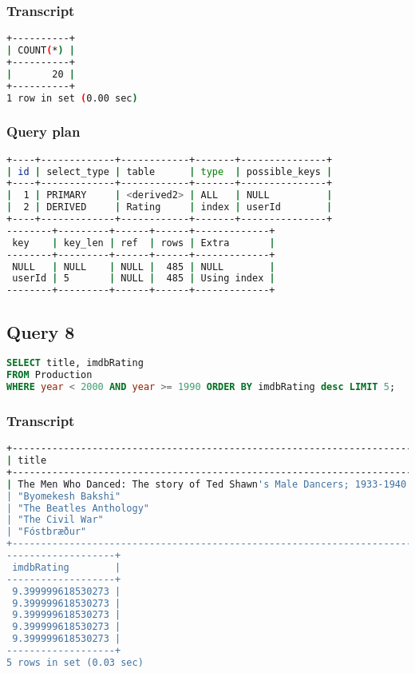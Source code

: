 \subsubsection{Transcript}
\begin{lstlisting}[language=bash]
+----------+
| COUNT(*) |
+----------+
|       20 |
+----------+
1 row in set (0.00 sec)
\end{lstlisting}

\subsubsection{Query plan}
\begin{lstlisting}[language=bash]
+----+-------------+------------+-------+---------------+
| id | select_type | table      | type  | possible_keys |
+----+-------------+------------+-------+---------------+
|  1 | PRIMARY     | <derived2> | ALL   | NULL          |
|  2 | DERIVED     | Rating     | index | userId        |
+----+-------------+------------+-------+---------------+
--------+---------+------+------+-------------+
 key    | key_len | ref  | rows | Extra       |
--------+---------+------+------+-------------+
 NULL   | NULL    | NULL |  485 | NULL        |
 userId | 5       | NULL |  485 | Using index |
--------+---------+------+------+-------------+
\end{lstlisting}


\bigskip
\subsection{Query 8}
\begin{lstlisting}[language=sql]
SELECT title, imdbRating
FROM Production
WHERE year < 2000 AND year >= 1990 ORDER BY imdbRating desc LIMIT 5;
\end{lstlisting}

\subsubsection{Transcript}
\begin{lstlisting}[language=bash]
+----------------------------------------------------------------------+
| title                                                                |
+----------------------------------------------------------------------+
| The Men Who Danced: The story of Ted Shawn's Male Dancers; 1933-1940 |
| "Byomekesh Bakshi"                                                   |
| "The Beatles Anthology"                                              |
| "The Civil War"                                                      |
| "Fóstbræður"                                                         |
+----------------------------------------------------------------------+
-------------------+
 imdbRating        |
-------------------+
 9.399999618530273 |
 9.399999618530273 |
 9.399999618530273 |
 9.399999618530273 |
 9.399999618530273 |
-------------------+
5 rows in set (0.03 sec)
\end{lstlisting}

